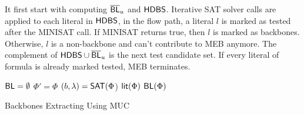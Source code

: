 It first start with computing $\overline{\textsf{BL}}_u$ and $\textsf{HDBS}$. Iterative SAT solver calls are applied to each literal in $\textsf{HDBS}$, in the flow path, a literal $l$ is marked as tested after the MINISAT call. If MINISAT returns true, then $l$ is marked as backbones. Otherwise, $l$ is a non-backbone and can't contribute to MEB anymore. The complement of $\textsf{HDBS}\cup\overline{\textsf{BL}}_u$ is the next test candidate set. If every literal of formula is already marked tested, MEB terminates.



\begin{algorithm}
\SetAlgoShortEnd
\SetFillComment
{}

$\textsf{BL}=\emptyset$\;
$\Phi'=\Phi$\;
$(b,\lambda)=\textsf{SAT}(\Phi$)\;
 \Return $\textsf{lit}(\Phi)$\;
\Return $\textsf{BL}(\Phi)$\;
\caption{Backbones Extracting Using MUC}
\label{alg:MUC}
\end{algorithm}





